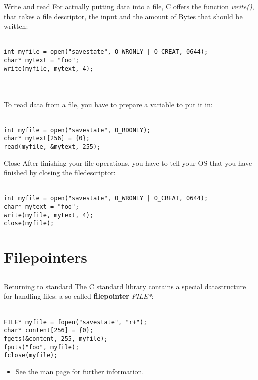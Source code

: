 \begin{frame}[fragile]{Write and read}
	For actually putting data into a file, C offers the function \textit{write()}, that takes a file descriptor, the input and the amount of Bytes that should be written:\\\ \\
	
	\begin{lstlisting}
int myfile = open("savestate", O_WRONLY | O_CREAT, 0644);
char* mytext = "foo";
write(myfile, mytext, 4);
\end{lstlisting}\ \\\ \\

	To read data from a file, you have to prepare a variable to put it in:\\\ \\
	
	\begin{lstlisting}
int myfile = open("savestate", O_RDONLY);
char* mytext[256] = {0};
read(myfile, &mytext, 255);
\end{lstlisting}
	
\end{frame}

\begin{frame}[fragile]{Close}
	After finishing your file operations, you have to tell your OS that you have finished by closing the filedescriptor:\\\ \\
	
	\begin{lstlisting}
int myfile = open("savestate", O_WRONLY | O_CREAT, 0644);
char* mytext = "foo";
write(myfile, mytext, 4);
close(myfile);
\end{lstlisting}
\end{frame}

\section{Filepointers}
\subsection{}

\begin{frame}[fragile]{Returning to standard}
	The C standard library contains a special datastructure for handling files: a so called \textbf{filepointer} \textit{FILE*}:\\\ \\
	
	\begin{lstlisting}
FILE* myfile = fopen("savestate", "r+");
char* content[256] = {0};
fgets(&content, 255, myfile);
fputs("foo", myfile);
fclose(myfile);
\end{lstlisting}

	\begin{itemize}
		\item See the man page for further information.
	\end{itemize}
\end{frame}

